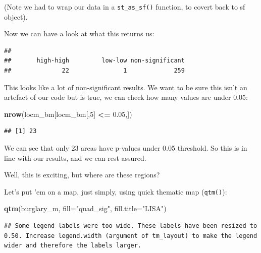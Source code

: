\documentclass[]{book}
\newenvironment{Shaded}{\begin{snugshade}}{\end{snugshade}}
\newcommand{\DataTypeTok}[1]{\textcolor[rgb]{0.13,0.29,0.53}{#1}}
\newcommand{\DecValTok}[1]{\textcolor[rgb]{0.00,0.00,0.81}{#1}}
\newcommand{\FloatTok}[1]{\textcolor[rgb]{0.00,0.00,0.81}{#1}}
\newcommand{\KeywordTok}[1]{\textcolor[rgb]{0.13,0.29,0.53}{\textbf{#1}}}
\newcommand{\NormalTok}[1]{#1}
\newcommand{\OperatorTok}[1]{\textcolor[rgb]{0.81,0.36,0.00}{\textbf{#1}}}
\newcommand{\StringTok}[1]{\textcolor[rgb]{0.31,0.60,0.02}{#1}}
\begin{document}
(Note we had to wrap our data in a \texttt{st\_as\_sf()} function, to covert back to sf object).

Now we can have a look at what this returns us:

\begin{Shaded}
\end{Shaded}

\begin{verbatim}
## 
##       high-high         low-low non-significant 
##              22               1             259
\end{verbatim}

This looks like a lot of non-significant results. We want to be sure this isn't an artefact of our code but is true, we can check how many values are under 0.05:

\begin{Shaded}
\begin{Highlighting}[]
\KeywordTok{nrow}\NormalTok{(locm_bm[locm_bm[,}\DecValTok{5}\NormalTok{] }\OperatorTok{<=}\StringTok{ }\FloatTok{0.05}\NormalTok{,])}
\end{Highlighting}
\end{Shaded}

\begin{verbatim}
## [1] 23
\end{verbatim}

We can see that only 23 areas have p-values under 0.05 threshold. So this is in line with our results, and we can rest assured.

Well, this is exciting, but where are these regions?

Let's put 'em on a map, just simply, using quick thematic map (\texttt{qtm()}):

\begin{Shaded}
\begin{Highlighting}[]
\KeywordTok{qtm}\NormalTok{(burglary_m, }\DataTypeTok{fill=}\StringTok{"quad_sig"}\NormalTok{, }\DataTypeTok{fill.title=}\StringTok{"LISA"}\NormalTok{)}
\end{Highlighting}
\end{Shaded}

\begin{verbatim}
## Some legend labels were too wide. These labels have been resized to 0.50. Increase legend.width (argument of tm_layout) to make the legend wider and therefore the labels larger.
\end{verbatim}
\end{document}
